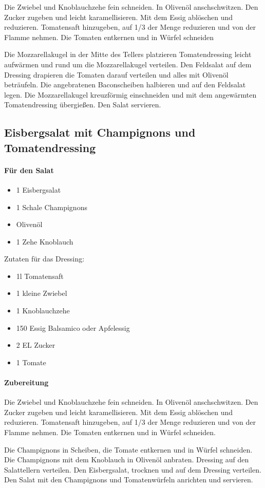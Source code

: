 Die Zwiebel und  Knoblauchzehe fein schneiden. In Olivenöl anschschwitzen.
Den Zucker zugeben und leicht karamellisieren. Mit dem Essig ablöschen und 
reduzieren.
Tomatensaft hinzugeben,  auf 1/3 der Menge reduzieren und von der Flamme 
nehmen. 
Die Tomaten entkernen und in Würfel schneiden

Die Mozzarellakugel in der Mitte des Tellers platzieren Tomatendressing leicht 
aufwärmen und rund
um die Mozzarellakugel verteilen.  Den Feldsalat auf dem Dressing drapieren 
die Tomaten darauf verteilen 
und alles mit Olivenöl beträufeln. Die angebratenen Baconscheiben halbieren 
und auf den Feldsalat legen. 
Die Mozzarellakugel kreuzförmig einschneiden und mit dem angewärmten 
Tomatendressing übergießen. 
Den Salat servieren.

\subsection{Eisbergsalat mit Champignons und Tomatendressing}

\paragraph{Für den Salat}

\begin{itemize}[noitemsep]
	\item 1 Eisbergsalat
	\item 1 Schale Champignons
	\item Olivenöl
	\item 1 Zehe Knoblauch
\end{itemize}

Zutaten für das Dressing:
\begin{itemize}[noitemsep]
	\item 1l Tomatensaft
	\item 1 kleine Zwiebel
	\item 1 Knoblauchzehe
	\item 150 Essig Balsamico oder Apfelessig
	\item 2 EL Zucker
	\item 1 Tomate
\end{itemize}

\paragraph{Zubereitung}

Die Zwiebel und  Knoblauchzehe fein schneiden. In Olivenöl anschschwitzen.
Den Zucker zugeben und leicht karamellisieren. Mit dem Essig ablöschen und 
reduzieren.
Tomatensaft hinzugeben,  auf 1/3 der Menge reduzieren und von der Flamme 
nehmen. 
Die Tomaten entkernen und in Würfel schneiden.

Die Champignons in Scheiben,  die Tomate entkernen und in Würfel schneiden. 
Die Champignons mit dem Knoblauch in 
Olivenöl anbraten. Dressing auf den Salattellern verteilen. Den Eisbergsalat, 
trocknen und auf dem Dressing verteilen. Den 
Salat mit den Champignons und Tomatenwürfeln anrichten und servieren.
